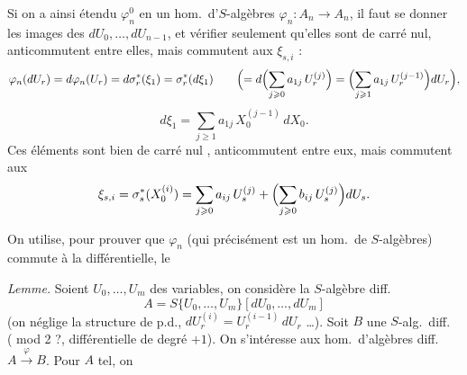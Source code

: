\documentclass[11pt,a4paper]{article}
\begin{document}
Si on a ainsi étendu $\varphi_n^0$ en un hom.\ d'$S$-algèbres
$\varphi_n : A_n \to A_n$, il faut se donner les images des
$dU_0, \ldots, dU_{n-1}$, et vérifier seulement qu'elles sont de carré nul,
\struck{\ill{}} anticommutent \ill{} entre elles, mais commutent aux $\xi_{s,i}$ :
\[
  \varphi_n(dU_r) = d\varphi_n(U_r) = d\sigma_r^{*}(\xi_1) = \sigma_r^{*}(d\xi_1)
  \qquad
  \Bigl(= d\Bigl(\sum_{j \geqslant 0} a_{1j}\,U_r^{(j)}\Bigr)
  = \Bigl(\sum_{j \geqslant 1} a_{1j}\,U_r^{(j-1)}\Bigr) dU_r\Bigr) ,
\]
\[
  d\xi_1 = \sum_{j \geqslant 1} a_{1j}\,X_0^{(j-1)}\,dX_0 .
\]
Ces éléments sont bien de carré nul \struck{\ill{}}, anticommutent entre eux,
mais commutent aux
\[
  \xi_{s,i} = \sigma_s^{*}(X_0^{(i)})
  = \sum_{j \geqslant 0} a_{ij}\,U_s^{(j)} + \Bigl(\sum_{j \geqslant 0} b_{ij}\,U_s^{(j)}\Bigr) dU_s .
\]

On utilise, pour prouver que $\varphi_n$ (qui précisément est un hom.\ de
$S$-algèbres) commute à la différentielle, le

\emph{Lemme.} Soient $U_0, \ldots, U_m$ des variables, on considère
\struck{\ill{}} la $S$-algèbre diff.\
\[
  A = S\{U_0, \ldots, U_m\}[dU_0, \ldots, dU_m]
\]
(on néglige la structure de p.d.,  $dU_r^{(i)} = U_r^{(i-1)}\,dU_r$ …).
Soit $B$ une $S$-alg.\ diff.\ \struck{\uncertain{alternée}} (\uncertain{qu.\ c.} mod 2 ?,
différentielle de degré $+1$).
On s'intéresse aux hom.\ d'algèbres diff.\ $A \xrightarrow{\ \varphi\ } B$.
Pour $A$ tel, on
\end{document}
